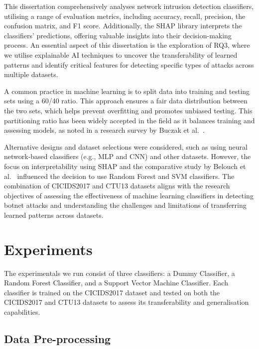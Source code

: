 This dissertation comprehensively analyses network intrusion detection classifiers, utilising a range of evaluation metrics, including accuracy, recall, precision, the confusion matrix, and F1 score. Additionally, the SHAP library interprets the classifiers' predictions, offering valuable insights into their decision-making process. An essential aspect of this dissertation is the exploration of RQ3, where we utilise explainable AI techniques to uncover the transferability of learned patterns and identify critical features for detecting specific types of attacks across multiple datasets.

A common practice in machine learning is to split data into training and testing sets using a 60/40 ratio. This approach ensures a fair data distribution between the two sets, which helps prevent overfitting and promotes unbiased testing. This partitioning ratio has been widely accepted in the field as it balances training and assessing models, as noted in a research survey by Buczak et al.~\cite{buczak2015survey}.

Alternative designs and dataset selections were considered, such as using neural network-based classifiers (e.g., MLP and CNN) and other datasets. However, the focus on interpretability using SHAP and the comparative study by Belouch et al.~\cite{belouch2018performance} influenced the decision to use Random Forest and SVM classifiers. The combination of CICIDS2017 and CTU13 datasets aligns with the research objectives of assessing the effectiveness of machine learning classifiers in detecting botnet attacks and understanding the challenges and limitations of transferring learned patterns across datasets.

\section{Experiments}\label{sec:Experiments}

The experimentals we run consist of three classifiers: a Dummy Classifier, a Random Forest Classifier, and a Support Vector Machine Classifier. Each classifier is trained on the CICIDS2017 dataset and tested on both the CICIDS2017 and CTU13 datasets to assess its transferability and generalisation capabilities.

\subsection{Data Pre-processing}\label{subsec:DataPreprocessing}

